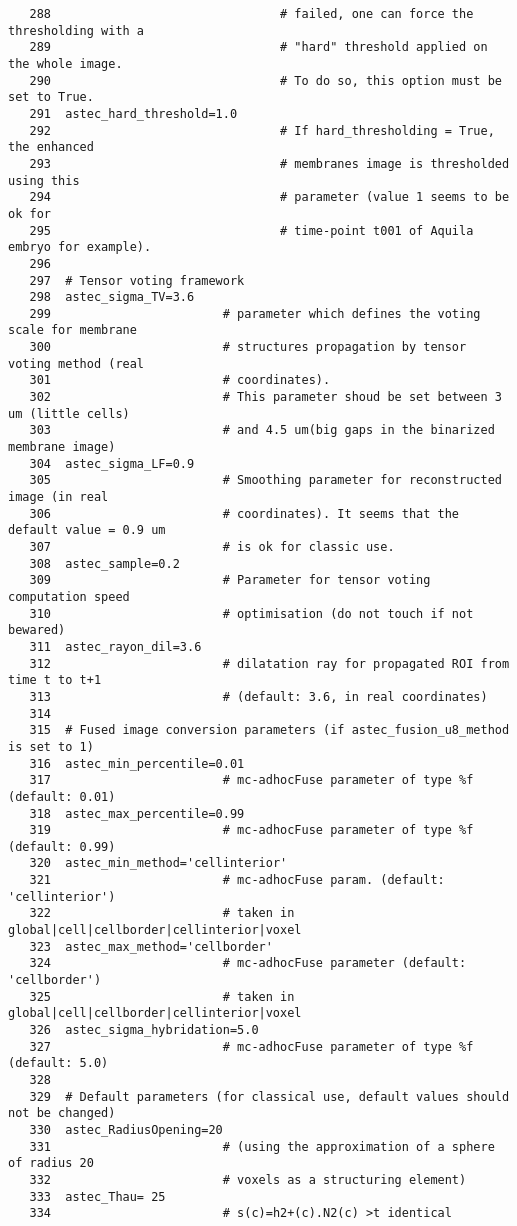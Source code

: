 \begin{verbatim}
   288								  # failed, one can force the thresholding with a
   289								  # "hard" threshold applied on the whole image. 
   290								  # To do so, this option must be set to True.
   291	astec_hard_threshold=1.0      
   292	                              # If hard_thresholding = True, the enhanced 
   293								  # membranes image is thresholded using this 
   294								  # parameter (value 1 seems to be ok for 
   295								  # time-point t001 of Aquila embryo for example).
   296	
   297	# Tensor voting framework
   298	astec_sigma_TV=3.6    
   299	                      # parameter which defines the voting scale for membrane
   300						  # structures propagation by tensor voting method (real
   301						  # coordinates). 
   302					 	  # This parameter shoud be set between 3 um (little cells)
   303					 	  # and 4.5 um(big gaps in the binarized membrane image)
   304	astec_sigma_LF=0.9    
   305	                      # Smoothing parameter for reconstructed image (in real
   306						  # coordinates). It seems that the default value = 0.9 um
   307						  # is ok for classic use.
   308	astec_sample=0.2      
   309	                      # Parameter for tensor voting computation speed 
   310						  # optimisation (do not touch if not bewared)
   311	astec_rayon_dil=3.6   
   312	                      # dilatation ray for propagated ROI from time t to t+1
   313						  # (default: 3.6, in real coordinates) 
   314	
   315	# Fused image conversion parameters (if astec_fusion_u8_method is set to 1)
   316	astec_min_percentile=0.01   
   317	                      # mc-adhocFuse parameter of type %f (default: 0.01)
   318	astec_max_percentile=0.99   
   319	                      # mc-adhocFuse parameter of type %f (default: 0.99)
   320	astec_min_method='cellinterior'
   321	                      # mc-adhocFuse param. (default: 'cellinterior')
   322					      # taken in global|cell|cellborder|cellinterior|voxel
   323	astec_max_method='cellborder'
   324	                      # mc-adhocFuse parameter (default: 'cellborder')
   325						  # taken in global|cell|cellborder|cellinterior|voxel
   326	astec_sigma_hybridation=5.0 
   327	                      # mc-adhocFuse parameter of type %f (default: 5.0)
   328	
   329	# Default parameters (for classical use, default values should not be changed)
   330	astec_RadiusOpening=20 		
   331	                      # (using the approximation of a sphere of radius 20
   332						  # voxels as a structuring element)
   333	astec_Thau= 25 				
   334	                      # s(c)=h2+(c).N2(c) >t identical

\end{verbatim}
